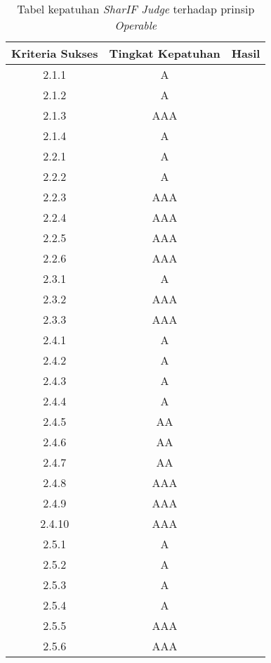 \begin{table}[H]
	\centering
	\caption{Tabel kepatuhan \textit{SharIF Judge} terhadap prinsip \textit{Operable}}
	\label{tab:kepatuhan_sharif_judge_operable}
	\begin{tabular}{|c|c|c|}
		\hline
		Kriteria Sukses & Tingkat Kepatuhan & Hasil \\
		\hline
		2.1.1 & A & \\
		2.1.2 & A & \\
		2.1.3 & AAA & \\
		2.1.4 & A & \\
		2.2.1 & A & \\
		2.2.2 & A & \\
		2.2.3 & AAA & \\
		2.2.4 & AAA & \\
		2.2.5 & AAA & \\
		2.2.6 & AAA & \\
		2.3.1 & A & \\
		2.3.2 & AAA & \\
		2.3.3 & AAA & \\
		2.4.1 & A & \\
		2.4.2 & A & \\
		2.4.3 & A & \\
		2.4.4 & A & \\
		2.4.5 & AA & \\
		2.4.6 & AA & \\
		2.4.7 & AA & \\
		2.4.8 & AAA & \\
		2.4.9 & AAA & \\
		2.4.10 & AAA & \\
		2.5.1 & A & \\
		2.5.2 & A & \\
		2.5.3 & A & \\
		2.5.4 & A & \\
		2.5.5 & AAA & \\
		2.5.6 & AAA & \\
		\hline
	\end{tabular}
\end{table}

